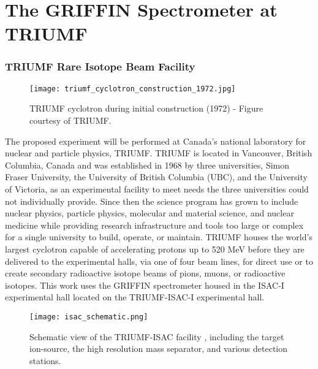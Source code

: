 \documentclass[cnatzke_thesis_proposal.tex]{subfiles}
\begin{document}
\chapter{The GRIFFIN Spectrometer at TRIUMF}

\subsection{TRIUMF Rare Isotope Beam Facility}
\begin{figure}[H]
  \begin{center}
    \texttt{[image: triumf\_cyclotron\_construction\_1972.jpg]}
  \end{center}
  \caption{TRIUMF cyclotron during initial construction (1972) - Figure courtesy of TRIUMF.}
  \label{fig:triumf_cyclotron_1972}
\end{figure}

The proposed experiment will be performed at Canada's national laboratory for nuclear and particle physics, TRIUMF. 
TRIUMF is located in Vancouver, British Columbia, Canada and was established in 1968 by three universities, Simon Fraser University, the University of British Columbia (UBC), and the University of Victoria, as an experimental facility to meet needs the three universities could not individually provide. 
Since then the science program has grown to include nuclear physics, particle physics, molecular and material science, and nuclear medicine while providing research infrastructure and tools too large or complex for a single university to build, operate, or maintain. 
TRIUMF houses the world's largest cyclotron \cite{dilling_isac_2014} capable of accelerating protons up to 520 MeV before they are delivered to the experimental halls, via one of four beam lines, for direct use or to create secondary radioactive isotope beams of pions, muons, or radioactive isotopes. 
This work uses the GRIFFIN spectrometer housed in the ISAC-I experimental hall located on the TRIUMF-ISAC-I experimental hall. 

\begin{center}
\begin{figure}[H]
  \begin{center}
    \texttt{[image: isac\_schematic.png]}
  \end{center}
  \caption{Schematic view of the TRIUMF-ISAC facility \cite{dilling_isac_2014}, including the target ion-source, the high resolution mass separator, and various detection stations.}
  \label{fig:ISAC_HALL}
\end{figure}
\end{center}
\end{document}
